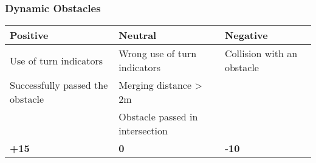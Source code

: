 {	\subsubsection*{Dynamic Obstacles}
	\begin{table}[H]
		\begin{tabularx}{\textwidth}{XXX}
			\toprule
			\textbf{Positive}                & \textbf{Neutral}                & \textbf{Negative}          \\
			\midrule
			Use of turn indicators           & Wrong use of turn indicators    & Collision with an obstacle \\
			Successfully passed the obstacle & Merging distance > 2m           &                            \\
			                                 & Obstacle passed in intersection &                            \\
			\topstrut
			\textbf{+15}                     & \textbf{0}                      & \textbf{-10}               \\
			\bottomrule
		\end{tabularx}
	\end{table}

}
